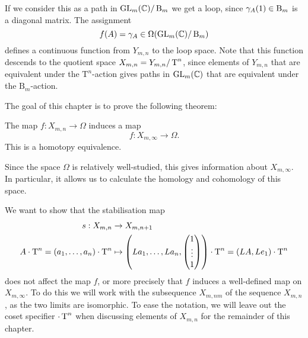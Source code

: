If we consider this as a path in $\operatorname{GL}_{m}(\mathbb{C})/\operatorname{B}_{m}$ we
get a loop, since $\gamma_A(1)\in\operatorname{B}_m$ is a diagonal matrix. The
assignment
\[ f(A) = \gamma_A \in \Omega(\operatorname{GL}_{m}(\mathbb{C})/\operatorname{B}_{m}) \]
defines a continuous function from $Y_{m,n}$ to the loop space. Note
that 
this function descends to the quotient space $X_{m,n}=Y_{m,n}/\operatorname{T}^n$, since
elements of $Y_{m,n}$ that are equivalent under the $\mathrm{T}^n$-action gives
paths in $\operatorname{GL}_m(\mathbb{C})$ that are equivalent under the $\mathrm{B}_m$-action.

The goal of this chapter is to prove the following theorem:

\begin{theorem}
  The map $f : X_{m,n} \to \Omega$ induces a map
  \[ f : X_{m,\infty} \to \Omega. \]
  This is a homotopy equivalence.
\end{theorem}

Since the space $\Omega$ is relatively well-studied, this gives
information about $X_{m,\infty}$. In particular, it allows us to
calculate the homology and cohomology of this space.

We want to show that the stabilisation map
\begin{align*}
  s : X_{m,n} &\to X_{m,n+1} \\
  A\cdot \operatorname{T}^n = (a_1,\dots,a_n)\cdot \operatorname{T}^n 
              &\mapsto \left(La_1,\dots,La_n,
    \begin{pmatrix}
      1 \\
      \vdots\\
      1
    \end{pmatrix} 
\right) \cdot \operatorname{T}^n = (LA,Le_1) \cdot \operatorname{T}^n
\end{align*}
does not affect the map $f$, or more precisely that $f$ induces a
well-defined map on $X_{m,\infty}$. To do this we will work with the
subsequence $X_{m,nm}$ of the sequence $X_{m,n}$, as the two limits
are isomorphic.  To
ease the notation, we will leave out the coset specifier $\cdot \operatorname{T}^n$
when discussing elements of $X_{m,n}$ for the remainder of this
chapter.

